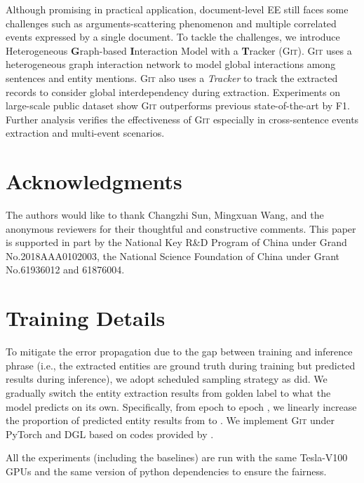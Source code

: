 \documentclass[11pt,a4paper]{article}
\newcommand{\modelname}{\textsc{Git}\xspace}
\begin{document}
Although promising in practical application, document-level EE still faces some challenges such as arguments-scattering phenomenon and multiple correlated events expressed by a single document.
To tackle the challenges, we introduce Heterogeneous \textbf{G}raph-based \textbf{I}nteraction Model with a \textbf{T}racker (\modelname).
\modelname uses a heterogeneous graph interaction network to model global interactions among sentences and entity mentions.
\modelname also uses a \textit{Tracker} to track the extracted records to consider global interdependency during extraction.
Experiments on large-scale public dataset \citep{zheng-etal-2019-doc2edag} show \modelname outperforms previous state-of-the-art by  F1.
Further analysis verifies the effectiveness of \modelname especially in cross-sentence events extraction and multi-event scenarios.

 
\section*{Acknowledgments}
The authors would like to thank Changzhi Sun, Mingxuan Wang, and the anonymous reviewers for their thoughtful and constructive comments.
This paper is supported in part by the National Key R\&D Program of China under Grand No.2018AAA0102003, the National Science Foundation of China under Grant No.61936012 and 61876004.




\appendix
\appendix

\section{Training Details}
\label{appendix-training}
To mitigate the error propagation due to the gap between training and inference phrase (i.e., the extracted entities are ground truth during training but predicted results during inference), we adopt scheduled sampling strategy \citep{10.5555/2969239.2969370} as \citet{zheng-etal-2019-doc2edag} did.
We gradually switch the entity extraction results from golden label to what the model predicts on its own. 
Specifically, from epoch  to epoch , we linearly increase the proportion of predicted entity results from  to .
We implement \modelname under PyTorch \citep{paszke2017automatic} and DGL \citep{wang2019dgl} based on codes provided by \citet{zheng-etal-2019-doc2edag}.

All the experiments (including the baselines) are run with the same  Tesla-V100 GPUs and the same version of python dependencies to ensure the fairness.
\end{document}
